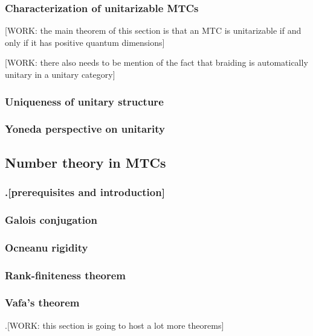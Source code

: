 \subsubsection{Characterization of unitarizable MTCs}

[WORK: the main theorem of this section is that an MTC is unitarizable if and only if it has positive quantum dimensions]

[WORK: there also needs to be mention of the fact that braiding is automatically unitary in a unitary category]

\subsubsection{Uniqueness of unitary structure}

\subsubsection{Yoneda perspective on unitarity}




\subsection{Number theory in MTCs}

\subsubsection{.[prerequisites and introduction]}

\subsubsection{Galois conjugation}

\subsubsection{Ocneanu rigidity}

\subsubsection{Rank-finiteness theorem}

\subsubsection{Vafa's theorem}

.[WORK: this section is going to host a lot more theorems]




